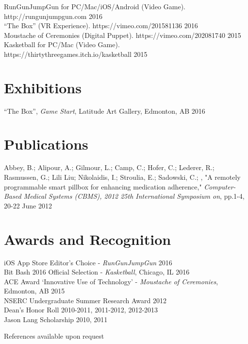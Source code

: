 \documentclass[10pt]{article}
\begin{document}
RunGunJumpGun for PC/Mac/iOS/Android (Video Game). http://rungunjumpgun.com \hfill 2016 \\

``The Box'' (VR Experience). https://vimeo.com/201581136 \hfill 2016 \\

Moustache of Ceremonies (Digital Puppet). https://vimeo.com/202081740 \hfill 2015 \\

Kasketball for PC/Mac (Video Game). https://thirtythreegames.itch.io/kasketball \hfill 2015 \\

\section*{Exhibitions}
``The Box'', \emph{Game Start}, Latitude Art Gallery, Edmonton, AB \hfill 2016 \\
\section*{Publications}
Abbey, B.; Alipour, A.; Gilmour, L.; Camp, C.; Hofer, C.; Lederer, R.; Rasmussen, G.; Lili Liu; Nikolaidis, I.; Stroulia, E.; Sadowski, C.; , "A remotely programmable smart pillbox for enhancing medication adherence," \emph{Computer-Based Medical Systems (CBMS), 2012 25th International Symposium on}, pp.1-4, 20-22 June 2012

\section*{Awards and Recognition}

\noindent iOS App Store Editor's Choice - \emph{RunGunJumpGun} \hfill 2016 \\

\noindent Bit Bash 2016 Official Selection - \emph{Kasketball}, Chicago, IL \hfill 2016 \\

\noindent ACE Award ‘Innovative Use of Technology’ - \emph{Moustache of Ceremonies}, Edmonton, AB \hfill 2015 \\

\noindent NSERC Undergraduate Summer Research Award \hfill 2012 \\

\noindent Dean's Honor Roll \hfill 2010-2011, 2011-2012, 2012-2013 \\

\noindent Jason Lang Scholarship \hfill 2010, 2011 \\

\vspace{\baselineskip}

\noindent References available upon request
\end{document}
